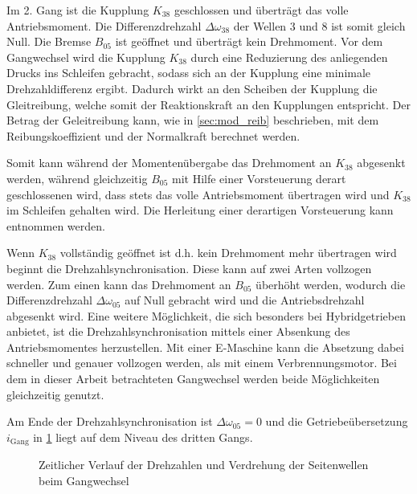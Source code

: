 Im 2. Gang ist die Kupplung $K_\mathrm{38}$ geschlossen und überträgt das volle Antriebsmoment. Die Differenzdrehzahl $\Delta \omega_{38}$ der Wellen 3 und 8 ist somit gleich Null. Die Bremse $B_\mathrm{05}$ ist geöffnet und überträgt kein Drehmoment. Vor dem Gangwechsel wird die Kupplung $K_\mathrm{38}$ durch eine Reduzierung des anliegenden Drucks ins Schleifen gebracht, sodass sich an der Kupplung eine minimale Drehzahldifferenz ergibt. Dadurch wirkt an den Scheiben der Kupplung die Gleitreibung, welche somit der Reaktionskraft an den Kupplungen entspricht. Der Betrag der Geleitreibung kann, wie in \ref{sec:mod_reib} beschrieben, mit dem Reibungskoeffizient und der Normalkraft berechnet werden.

Somit kann während der Momentenübergabe das Drehmoment an $K_\mathrm{38}$ abgesenkt werden, während gleichzeitig $B_\mathrm{05}$ mit Hilfe einer Vorsteuerung derart geschlossenen wird, dass stets das volle Antriebsmoment übertragen wird und $K_\mathrm{38}$ im Schleifen gehalten wird. Die Herleitung einer derartigen Vorsteuerung kann \cite{Weber.2018} entnommen werden.    
  
Wenn $K_\mathrm{38}$ vollständig geöffnet ist d.h. kein Drehmoment mehr übertragen wird beginnt die Drehzahlsynchronisation. Diese kann auf zwei Arten vollzogen werden. Zum einen kann das Drehmoment an $B_\mathrm{05}$ überhöht werden, wodurch die Differenzdrehzahl $\Delta \omega_{05}$ auf Null gebracht wird und die Antriebsdrehzahl abgesenkt wird. Eine weitere Möglichkeit, die sich besonders bei Hybridgetrieben anbietet, ist die Drehzahlsynchronisation mittels einer Absenkung des Antriebsmomentes herzustellen. Mit einer E-Maschine kann die Absetzung dabei schneller und genauer vollzogen werden, als mit einem Verbrennungsmotor. Bei dem in dieser Arbeit betrachteten Gangwechsel werden beide Möglichkeiten gleichzeitig genutzt.

Am Ende der Drehzahlsynchronisation ist $\Delta \omega_{05}=0$ und die Getriebeübersetzung $i_\textrm{Gang}$ in \ref{fig:Gang23_Geschw} liegt auf dem Niveau des dritten Gangs.

\begin{figure}[h]
\centering
\newlength\fheight 
\setlength\fheight{8cm}
\newlength\fwidth 
\setlength\fwidth{13cm}

\caption{Zeitlicher Verlauf der Drehzahlen und Verdrehung der Seitenwellen beim Gangwechsel}
\label{fig:Gang23_Geschw}
\end{figure}

